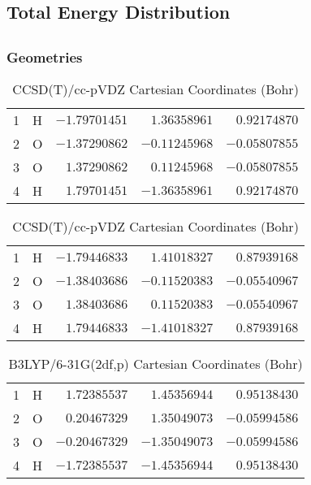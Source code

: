 \documentclass[10pt,oneside]{article}
\begin{document}
\begin{table}
\subsection*{Total Energy Distribution}
\centering\end{table}

\clearpage

\subsection{}

\begin{table}[h!]
\subsubsection*{Geometries}
\begin{multicols}{2}
\centering
\caption{CCSD(T)/cc-pVTZ Cartesian Coordinates (Bohr)}
\begin{tabular}{llrrr}
\toprule
1  & H  & $-1.79701451$ & $ 1.36358961$ & $ 0.92174870$ \\
2  & O  & $-1.37290862$ & $-0.11245968$ & $-0.05807855$ \\
3  & O  & $ 1.37290862$ & $ 0.11245968$ & $-0.05807855$ \\
4  & H  & $ 1.79701451$ & $-1.36358961$ & $ 0.92174870$ \\
\bottomrule
\end{tabular}
\caption{CCSD(T)/cc-pVDZ Cartesian Coordinates (Bohr)}
\begin{tabular}{llrrr}
\toprule
1  & H  & $-1.79446833$ & $ 1.41018327$ & $ 0.87939168$ \\
2  & O  & $-1.38403686$ & $-0.11520383$ & $-0.05540967$ \\
3  & O  & $ 1.38403686$ & $ 0.11520383$ & $-0.05540967$ \\
4  & H  & $ 1.79446833$ & $-1.41018327$ & $ 0.87939168$ \\
\bottomrule
\end{tabular}
\end{multicols}
\end{table}

\begin{table}[h]
\centering
\caption{B3LYP/6-31G(2df,p) Cartesian Coordinates (Bohr)}
\begin{tabular}{llrrr}
\toprule
1  & H  & $ 1.72385537$ & $ 1.45356944$ & $ 0.95138430$ \\
2  & O  & $ 0.20467329$ & $ 1.35049073$ & $-0.05994586$ \\
3  & O  & $-0.20467329$ & $-1.35049073$ & $-0.05994586$ \\
4  & H  & $-1.72385537$ & $-1.45356944$ & $ 0.95138430$ \\
\bottomrule
\end{tabular}
\end{table}
\end{document}
